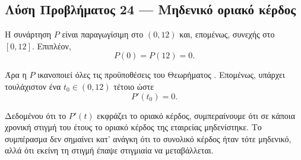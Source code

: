\subsection*{Λύση Προβλήματος 24 --- Μηδενικό οριακό κέρδος}

Η συνάρτηση $P$ είναι παραγωγίσιμη στο $(0,12)$ και, επομένως, συνεχής
στο $[0,12]$. Επιπλέον,
\[
  P(0)=P(12)=0.
\]

Άρα η $P$ ικανοποιεί όλες τις προϋποθέσεις του Θεωρήματος .
Επομένως, υπάρχει τουλάχιστον ένα $t_0\in(0,12)$ τέτοιο ώστε
\[
  {P'(t_0)=0}.
\]

Δεδομένου ότι το $P'(t)$ εκφράζει το οριακό κέρδος, συμπεραίνουμε ότι
σε κάποια χρονική στιγμή του έτους το οριακό κέρδος της εταιρείας
μηδενίστηκε. Το συμπέρασμα δεν σημαίνει κατ' ανάγκη ότι το συνολικό
κέρδος ήταν τότε μηδενικό, αλλά ότι εκείνη τη στιγμή έπαψε στιγμιαία να
μεταβάλλεται.
